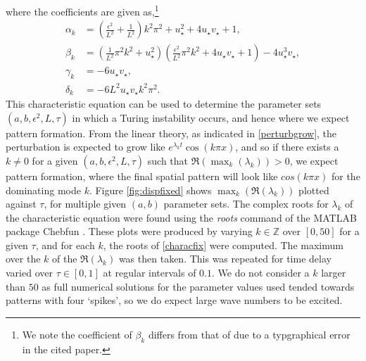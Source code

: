 where the coefficients are given as,\footnote{We note the coefficient of $\beta_k$ differs from that of \cite{yigaffneyli} due to a typgraphical error in the cited paper.}
\begin{align}
\alpha_k&=\left(\frac{\epsilon^2}{L^2}+\frac{1}{L^2}\right)k^2\pi^2+u_\star^2+4u_\star v_\star+1,\\
\beta_k&=\left(\frac{1}{L^2}\pi^2k^2+u_\star^2\right)\left(\frac{\epsilon^2}{L^2}\pi^2k^2+4u_\star v_\star+1\right)-4u_\star^3v_\star,\\
\gamma_k&=-6u_\star v_\star,\\
\delta_k&=-{6}{L^2}u_\star v_\star k^2\pi^2.
\end{align}
This characteristic equation can be used to determine the parameter sets $(a,b,\epsilon^2,L,\tau)$ in which a Turing instability occurs, and hence where we expect pattern formation. From the linear theory, as indicated in \eqref{perturbgrow}, the perturbation is expected to grow like $e^{\lambda_k t}\cos(k\pi x)$, and so if there exists a $k\neq0$ for a given $(a,b,\epsilon^2,L,\tau)$ such that $\Re(\max_k(\lambda_k))>0$, we expect pattern formation, where the final spatial pattern will look like $cos(k\pi x)$ for the dominating mode $k$. Figure \ref{fig:dispfixed} shows $\max_k(\Re(\lambda_k))$ plotted against $\tau$, for multiple given $(a,b)$ parameter sets. The complex roots for $\lambda_k$ of the characteristic equation were found using the \emph{roots} command of the MATLAB package Chebfun \cite{chebfun}. These plots were produced by varying $k\in\mathbb{Z}$ over $[0,50]$ for a given $\tau$, and for each $k$, the roots of \eqref{characfix} were computed. The maximum over the $k$ of the $\Re(\lambda_k)$ was then taken. This was repeated for time delay varied over $\tau\in[0,1]$ at regular intervals of $0.1$. We do not consider a $k$ larger than $50$ as full numerical solutions for the parameter values used tended towards patterns with four `spikes', so we do expect large wave numbers to be excited.

